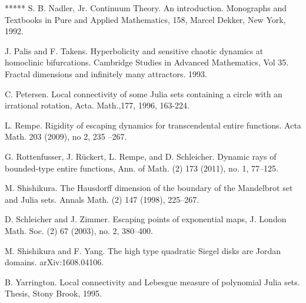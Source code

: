 \begin{thebibliography}{*****}
  S. B. Nadler, Jr. Continuum Theory. An introduction.
Monographs and Textbooks in Pure and Applied Mathematics, 158, Marcel Dekker, New York, 1992.

 J. Palis and F. Takens. Hyperbolicity and sensitive chaotic dynamics at homoclinic bifurcations. Cambridge Studies in Advanced Mathematics, Vol 35. Fractal dimensions and infinitely many attractors. 1993.



 C. Petersen. Local connectivity of some Julia sets containing a circle with an irrational rotation, Acta. Math.,177, 1996, 163-224.



 L. Rempe. Rigidity of escaping dynamics for transcendental entire functions.  Acta Math. 203 (2009), no 2, 235 --267.



 G. Rottenfusser, J. R\"uckert, L. Rempe, and D. Schleicher. Dynamic rays
of bounded-type entire functions, Ann. of Math. (2) 173 (2011), no. 1, 77--125.


 M. Shishikura. The Hausdorff dimension of the boundary of the Mandelbrot set and Julia sets. Annals Math. (2) 147 (1998), 225--267.


 D. Schleicher and J. Zimmer. Escaping points of exponential maps, J. London
Math. Soc. (2) 67 (2003), no. 2, 380--400.

 M. Shishikura and F. Yang. The high type quadratic Siegel disks are Jordan domains. arXiv:1608.04106.











 
 B. Yarrington. Local connectivity and Lebesgue measure of polynomial Julia sets. Thesis,
Stony Brook, 1995.







  




\end{thebibliography}
